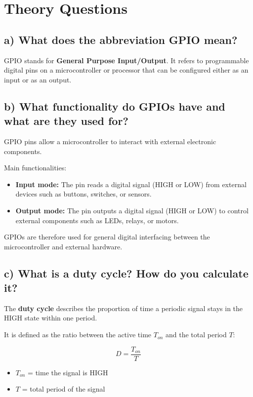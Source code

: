 
\section{Theory Questions}

\subsection{a) What does the abbreviation GPIO mean?}
GPIO stands for \textbf{General Purpose Input/Output}. It refers to programmable digital pins on a microcontroller or processor that can be configured either as an input or as an output.

\subsection{b) What functionality do GPIOs have and what are they used for?}
GPIO pins allow a microcontroller to interact with external electronic components.

Main functionalities:
\begin{itemize}
	\item \textbf{Input mode:} The pin reads a digital signal (HIGH or LOW) from external devices such as buttons, switches, or sensors.
	\item \textbf{Output mode:} The pin outputs a digital signal (HIGH or LOW) to control external components such as LEDs, relays, or motors.
\end{itemize}

GPIOs are therefore used for general digital interfacing between the microcontroller and external hardware.

\subsection{c) What is a duty cycle? How do you calculate it?}
The \textbf{duty cycle} describes the proportion of time a periodic signal stays in the HIGH state within one period.

It is defined as the ratio between the active time \(T_{on}\) and the total period \(T\):

\[
	D = \frac{T_{on}}{T}
\]

\begin{itemize}
	\item \(T_{on}\) = time the signal is HIGH
	\item \(T\) = total period of the signal
\end{itemize}
